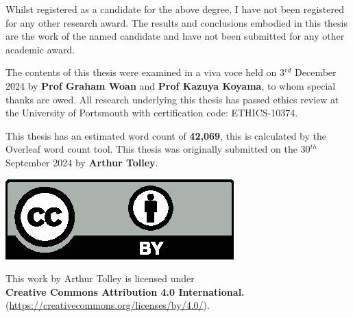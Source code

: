 Whilst registered as a candidate for the above degree, I have not been registered for any other research award. The results and conclusions embodied in this thesis are the work of the named candidate and have not been submitted for any other academic award.

\vspace{\baselineskip}
The contents of this thesis were examined in a viva voce held on 3$^{rd}$ December 2024 by \textbf{Prof Graham Woan} and \textbf{Prof Kazuya Koyama}, to whom special thanks are owed. All research underlying this thesis has passed ethics review at the University of Portsmouth with certification code: ETHICS-10374.

\vspace{\baselineskip}
This thesis has an estimated word count of \textbf{\textcolor{teal!50}{42,069}}, this is calculated by the Overleaf word count tool. This thesis was originally submitted on the 30$^{th}$ September 2024 by \textbf{Arthur Tolley}.

\vspace{\baselineskip}
\vfill %
\begin{center}
    \begin{minipage}{0.35\textwidth} %
        \includegraphics[width=\textwidth]{images/preamble/by.eps}
    \end{minipage}%
    \hspace{0.02\textwidth} %
    \begin{minipage}{0.6\textwidth} %
        This work by Arthur Tolley is licensed under \\
        \textbf{Creative Commons Attribution 4.0 International.} \\
        (\href{https://creativecommons.org/licenses/by/4.0/}{https://creativecommons.org/licenses/by/4.0/}).
    \end{minipage}
\end{center}